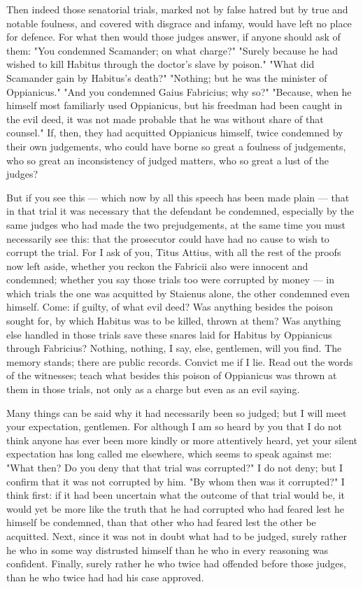  Then indeed those senatorial trials, marked not by false hatred but by true and notable foulness, and covered with disgrace and infamy, would have left no place for defence. For what then would those judges answer, if anyone should ask of them: "You condemned Scamander; on what charge?" "Surely because he had wished to kill Habitus through the doctor's slave by poison." "What did Scamander gain by Habitus's death?" "Nothing; but he was the minister of Oppianicus." "And you condemned Gaius Fabricius; why so?" "Because, when he himself most familiarly used Oppianicus, but his freedman had been caught in the evil deed, it was not made probable that he was without share of that counsel." If, then, they had acquitted Oppianicus himself, twice condemned by their own judgements, who could have borne so great a foulness of judgements, who so great an inconsistency of judged matters, who so great a lust of the judges?

 But if you see this --- which now by all this speech has been made plain --- that in that trial it was necessary that the defendant be condemned, especially by the same judges who had made the two prejudgements, at the same time you must necessarily see this: that the prosecutor could have had no cause to wish to corrupt the trial. For I ask of you, Titus Attius, with all the rest of the proofs now left aside, whether you reckon the Fabricii also were innocent and condemned; whether you say those trials too were corrupted by money --- in which trials the one was acquitted by Staienus alone, the other condemned even himself. Come: if guilty, of what evil deed? Was anything besides the poison sought for, by which Habitus was to be killed, thrown at them? Was anything else handled in those trials save these snares laid for Habitus by Oppianicus through Fabricius? Nothing, nothing, I say, else, gentlemen, will you find. The memory stands; there are public records. Convict me if I lie. Read out the words of the witnesses; teach what besides this poison of Oppianicus was thrown at them in those trials, not only as a charge but even as an evil saying.

 Many things can be said why it had necessarily been so judged; but I will meet your expectation, gentlemen. For although I am so heard by you that I do not think anyone has ever been more kindly or more attentively heard, yet your silent expectation has long called me elsewhere, which seems to speak against me: "What then? Do you deny that that trial was corrupted?" I do not deny; but I confirm that it was not corrupted by him. "By whom then was it corrupted?" I think first: if it had been uncertain what the outcome of that trial would be, it would yet be more like the truth that he had corrupted who had feared lest he himself be condemned, than that other who had feared lest the other be acquitted. Next, since it was not in doubt what had to be judged, surely rather he who in some way distrusted himself than he who in every reasoning was confident. Finally, surely rather he who twice had offended before those judges, than he who twice had had his case approved.

